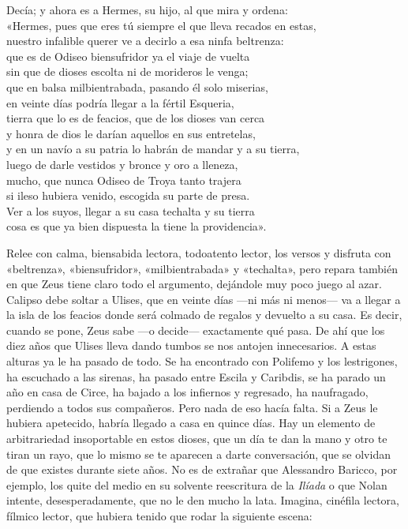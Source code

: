 \begin{versocita}
Decía; y ahora es a Hermes, su hijo, al que mira y ordena:\\
«Hermes, pues que eres tú siempre el que lleva recados en estas,\\
nuestro infalible querer ve a decirlo a esa ninfa beltrenza:\\
que es de Odiseo biensufridor ya el viaje de vuelta\\
sin que de dioses escolta ni de morideros le venga;\\
que en balsa milbientrabada, pasando él solo miserias,\\
en veinte días podría llegar a la fértil Esqueria,\\
tierra que lo es de feacios, que de los dioses van cerca\\
y honra de dios le darían aquellos en sus entretelas,\\
y en un navío a su patria lo habrán de mandar y a su tierra,\\
luego de darle vestidos y bronce y oro a lleneza,\\
mucho, que nunca Odiseo de Troya tanto trajera\\
si ileso hubiera venido, escogida su parte de presa.\\
Ver a los suyos, llegar a su casa techalta y su tierra\\
cosa es que ya bien dispuesta la tiene la providencia».
\end{versocita}

Relee con calma, biensabida lectora, todoatento lector, los versos y disfruta con «beltrenza», «biensufridor», «milbientrabada» y «techalta», pero repara también en que Zeus tiene claro todo el argumento, dejándole muy poco juego al azar. Calipso debe soltar a Ulises, que en veinte días ---ni más ni menos--- va a llegar a la isla de los feacios donde será colmado de regalos y devuelto a su casa. Es decir, cuando se pone, Zeus sabe ---o decide--- exactamente qué pasa. De ahí que los diez años que Ulises lleva dando tumbos se nos antojen innecesarios. A estas alturas ya le ha pasado de todo. Se ha encontrado con Polifemo y los lestrigones, ha escuchado a las sirenas, ha pasado entre Escila y Caribdis, se ha parado un año en casa de Circe, ha bajado a los infiernos y regresado, ha naufragado, perdiendo a todos sus compañeros. Pero nada de eso hacía falta. Si a Zeus le hubiera apetecido, habría llegado a casa en quince días. Hay un elemento de arbitrariedad insoportable en estos dioses, que un día te dan la mano y otro te tiran un rayo, que lo mismo se te aparecen a darte conversación, que se olvidan de que existes durante siete años. No es de extrañar que Alessandro Baricco, por ejemplo, los quite del medio en su solvente reescritura de la \emph{Ilíada} o que Nolan intente, desesperadamente, que no le den mucho la lata. Imagina, cinéfila lectora, fílmico lector, que hubiera tenido que rodar la siguiente escena:

